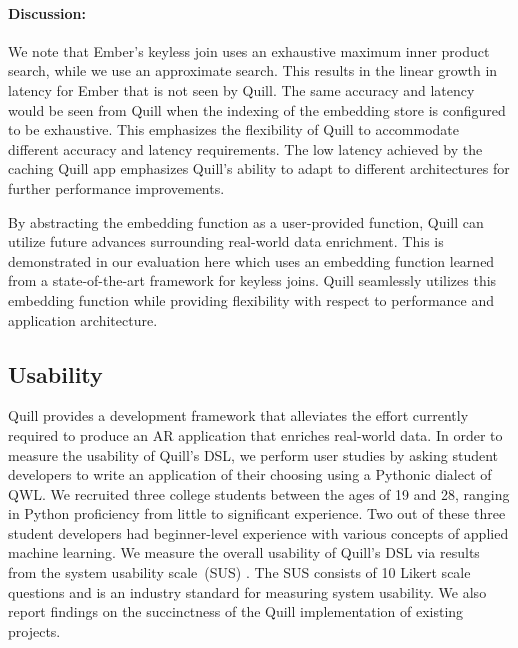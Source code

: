 \documentclass[11pt]{article}
\begin{document}
\paragraph{Discussion:}
We note that Ember's keyless join uses an exhaustive maximum inner product search, while we use an approximate search.
This results in the linear growth in latency for Ember that is not seen by Quill.
The same accuracy and latency would be seen from Quill when the indexing of the embedding store is configured to be exhaustive.
This emphasizes the flexibility of Quill to accommodate different accuracy and latency requirements.
The low latency achieved by the caching Quill app emphasizes Quill's ability to adapt to different architectures for further performance improvements.

By abstracting the embedding function as a user-provided function, Quill can utilize future advances surrounding real-world data enrichment.
This is demonstrated in our evaluation here which uses an embedding function learned from a state-of-the-art framework for keyless joins.
Quill seamlessly utilizes this embedding function while providing flexibility with respect to performance and application architecture.


\subsection{Usability}
\label{sec:evaluation:usability}
Quill provides a development framework that alleviates the effort currently required to produce an AR application that enriches real-world data.
In order to measure the usability of Quill's DSL, we perform user studies by asking student developers to write an application of their choosing using a Pythonic dialect of QWL. We recruited three college students between the ages of 19 and 28, ranging in Python proficiency from little to significant experience. Two out of these three student developers had beginner-level experience with various concepts of applied machine learning. We measure the overall usability of Quill's DSL via results from the system usability scale~(SUS) \cite{brooke1996sus}.
The SUS consists of 10 Likert scale questions and is an industry standard for measuring system usability.
We also report findings on the succinctness of the Quill implementation of existing projects.\vspace{0.1cm}
\end{document}
